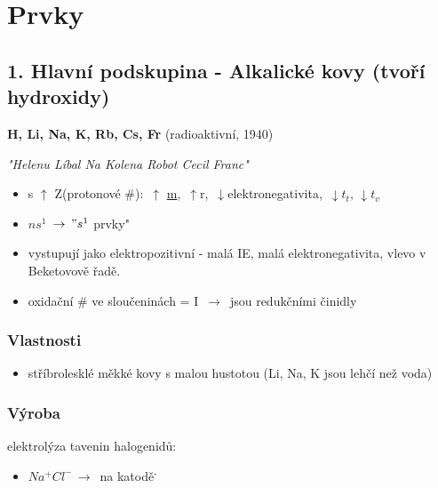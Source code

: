     
\TabPositions{0em, 20em}
\section{Prvky}
\subsection{1. Hlavní podskupina - Alkalické kovy (tvoří hydroxidy)}
    \textbf{H, Li, Na, K, Rb, Cs, Fr} (radioaktivní, 1940)

    \textit{"Helenu Líbal Na Kolena Robot Cecil Franc"}
    \begin{itemize}
        \item s $\uparrow$ Z(protonové \#): $\, \uparrow$ \underline{m}, $\, \uparrow$r, $\, \downarrow$elektronegativita, $\, \downarrow t_t, \, \downarrow t_v$
        \item $ns^1$ \fbox{$\downarrow$} $\,\to\, "s^1$ prvky"
        
        \item vystupují jako elektropozitivní - malá IE, malá elektronegativita, vlevo v Beketovově řadě.
        \item oxidační \# ve sloučeninách = I $\,\to\,$ jsou redukčními činidly
    \end{itemize}
    \subsubsection*{Vlastnosti}
        \begin{itemize}
            \item stříbrolesklé měkké kovy s malou hustotou (Li, Na, K jsou lehčí než voda)
        \end{itemize}
    \subsubsection*{Výroba}
        elektrolýza tavenin halogenidů:
        \begin{itemize}
            \item $Na^+Cl^-\,\to\,$ na katodě$^{\textbf{-}}$
        \end{itemize}
